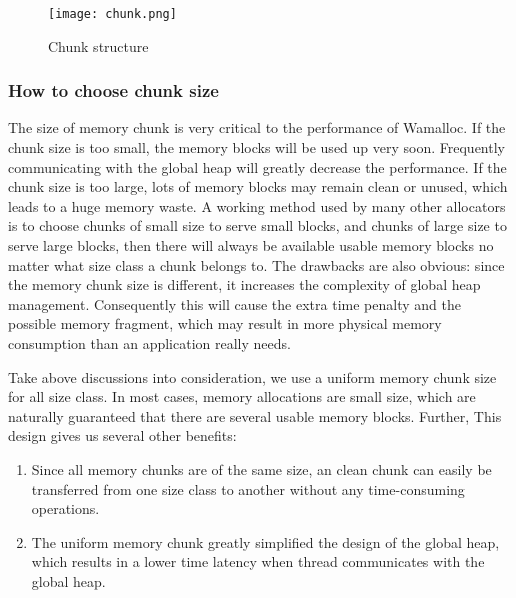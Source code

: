 \documentclass[10pt, conference, compsocconf]{IEEEtran}
\begin{document}
\begin{figure}[h]
\centering
\texttt{[image: chunk.png]}
\caption{Chunk structure}
\label{fig:chunk}
\end{figure}

\subsubsection{How to choose chunk size}
The size of memory chunk is very critical to the performance of Wamalloc. 
If the chunk size is too small, 
the memory blocks will be used up very soon.
Frequently communicating with the global heap will greatly decrease the performance.
If the chunk size is too large, lots of memory blocks may remain clean or unused, which leads to a huge memory waste. 
A working method used by many other allocators is to choose chunks of small size to serve small blocks, 
and chunks of large size to serve large blocks,
then there will always be available usable memory blocks no matter what size class a chunk belongs to.
The drawbacks are also obvious:
since the memory chunk size is different, it increases the complexity of global heap management.
Consequently this will cause the extra time penalty and the possible memory fragment, 
which may result in more physical memory consumption than an application really needs.

Take above discussions into consideration, 
we use a uniform memory chunk size for all size class. 
In most cases, memory allocations are small size, 
which are naturally guaranteed that there are several usable memory blocks. 
Further, This design gives us several other benefits: 
\begin{enumerate}
    \item Since all memory chunks are of the same size, an clean chunk can easily be transferred from one size class to another without any time-consuming operations.
    \item The uniform memory chunk greatly simplified the design of the global heap, 
        which results in a lower time latency when thread communicates with the global heap.
\end{enumerate}
\end{document}
